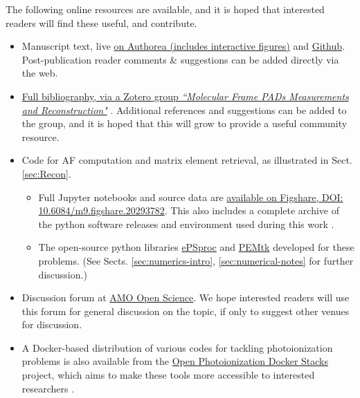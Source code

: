 \documentclass[10pt]{article}
\begin{document}
The following online resources are available, and it is hoped that interested readers will find these useful, and contribute.

\begin{itemize}
\item Manuscript text, live \href{https://www.authorea.com/users/71114/articles/447808-extracting-molecular-frame-photoionization-dynamics-from-experimental-data}{on Authorea (includes interactive figures)} and \href{https://github.com/phockett/Extracting-Molecular-Frame-Photoionization-Dynamics-from-Experimental-Data}{Github}. Post-publication reader comments \& suggestions can be added directly via the web.
\item \href{https://www.zotero.org/groups/4733878/molecular_frame_pads_measurements_and_reconstruction}{Full bibliography, via a Zotero group \textit{``Molecular Frame PADs Measurements and Reconstruction"}} \cite{hockettZoteroGroupsMolecular}. Additional references and suggestions can be added to the group, and it is hoped that this will grow to provide a useful community resource.
\item Code for AF computation and matrix element retrieval, as illustrated in Sect. \ref{sec:Recon}. 
\begin{itemize}
\item Full Jupyter notebooks and source data are \href{http://dx.doi.org/10.6084/m9.figshare.20293782}{available on Figshare, DOI: 10.6084/m9.figshare.20293782}. This also includes a complete archive of the python software releases and environment used during this work \cite{hockett2022MFreconFigshare}.
\item The open-source python libraries \href{https://epsproc.readthedocs.io}{ePSproc} \cite{ePSprocAuthorea,ePSprocGithub,ePSprocDocs} and \href{https://pemtk.readthedocs.io}{PEMtk} \cite{hockett2021PEMtkDocs, hockett2021PEMtkGithub} developed for these problems. (See Sects. \ref{sec:numerics-intro}, \ref{sec:numerical-notes} for further discussion.)
\end{itemize}
\item Discussion forum at \href{https://amoopenscience.femtolab.ca/}{AMO Open Science}. We hope interested readers will use this forum for general discussion on the topic, if only to suggest other venues for discussion.
\item A Docker-based distribution of various codes for tackling photoionization problems is also available from the \href{https://github.com/phockett/open-photoionization-docker-stacks}{Open Photoionization Docker Stacks} project, which aims to make these tools more accessible to interested researchers \cite{hockettOpenPhotoionizationDocker}.
\end{itemize}
\end{document}
